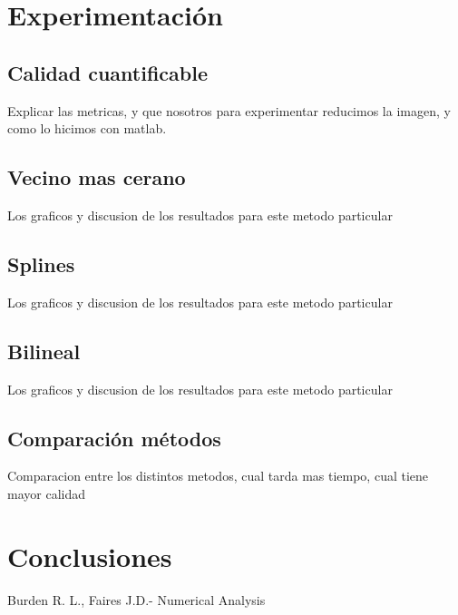 \documentclass[a4paper]{article}
\begin{document}
\section{Experimentación}

\subsection{Calidad cuantificable}

Explicar las metricas, y que nosotros para experimentar reducimos la imagen, y como lo hicimos con matlab.

\subsection{Vecino mas cerano}

Los graficos y discusion de los resultados para este metodo particular

\subsection{Splines}

Los graficos y discusion de los resultados para este metodo particular

\subsection{Bilineal}

Los graficos y discusion de los resultados para este metodo particular

\subsection{Comparación métodos}

Comparacion entre los distintos metodos, cual tarda mas tiempo, cual tiene mayor calidad


\section{Conclusiones}

\begin{thebibliography}{abbrvnat}
 Burden R. L., Faires J.D.- Numerical Analysis
\end{thebibliography}
\end{document}
